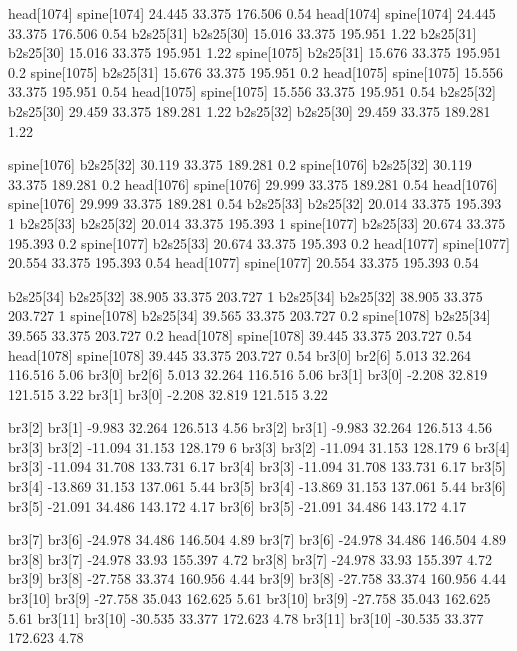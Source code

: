 head[1074]    spine[1074]    24.445    33.375    176.506    0.54
head[1074]    spine[1074]    24.445    33.375    176.506    0.54
b2s25[31]    b2s25[30]    15.016    33.375    195.951    1.22
b2s25[31]    b2s25[30]    15.016    33.375    195.951    1.22
spine[1075]    b2s25[31]    15.676    33.375    195.951    0.2
spine[1075]    b2s25[31]    15.676    33.375    195.951    0.2
head[1075]    spine[1075]    15.556    33.375    195.951    0.54
head[1075]    spine[1075]    15.556    33.375    195.951    0.54
b2s25[32]    b2s25[30]    29.459    33.375    189.281    1.22
b2s25[32]    b2s25[30]    29.459    33.375    189.281    1.22


spine[1076]    b2s25[32]    30.119    33.375    189.281    0.2
spine[1076]    b2s25[32]    30.119    33.375    189.281    0.2
head[1076]    spine[1076]    29.999    33.375    189.281    0.54
head[1076]    spine[1076]    29.999    33.375    189.281    0.54
b2s25[33]    b2s25[32]    20.014    33.375    195.393    1
b2s25[33]    b2s25[32]    20.014    33.375    195.393    1
spine[1077]    b2s25[33]    20.674    33.375    195.393    0.2
spine[1077]    b2s25[33]    20.674    33.375    195.393    0.2
head[1077]    spine[1077]    20.554    33.375    195.393    0.54
head[1077]    spine[1077]    20.554    33.375    195.393    0.54


b2s25[34]    b2s25[32]    38.905    33.375    203.727    1
b2s25[34]    b2s25[32]    38.905    33.375    203.727    1
spine[1078]    b2s25[34]    39.565    33.375    203.727    0.2
spine[1078]    b2s25[34]    39.565    33.375    203.727    0.2
head[1078]    spine[1078]    39.445    33.375    203.727    0.54
head[1078]    spine[1078]    39.445    33.375    203.727    0.54
br3[0]    br2[6]    5.013    32.264    116.516    5.06
br3[0]    br2[6]    5.013    32.264    116.516    5.06
br3[1]    br3[0]    -2.208    32.819    121.515    3.22
br3[1]    br3[0]    -2.208    32.819    121.515    3.22


br3[2]    br3[1]    -9.983    32.264    126.513    4.56
br3[2]    br3[1]    -9.983    32.264    126.513    4.56
br3[3]    br3[2]    -11.094    31.153    128.179    6
br3[3]    br3[2]    -11.094    31.153    128.179    6
br3[4]    br3[3]    -11.094    31.708    133.731    6.17
br3[4]    br3[3]    -11.094    31.708    133.731    6.17
br3[5]    br3[4]    -13.869    31.153    137.061    5.44
br3[5]    br3[4]    -13.869    31.153    137.061    5.44
br3[6]    br3[5]    -21.091    34.486    143.172    4.17
br3[6]    br3[5]    -21.091    34.486    143.172    4.17


br3[7]    br3[6]    -24.978    34.486    146.504    4.89
br3[7]    br3[6]    -24.978    34.486    146.504    4.89
br3[8]    br3[7]    -24.978    33.93    155.397    4.72
br3[8]    br3[7]    -24.978    33.93    155.397    4.72
br3[9]    br3[8]    -27.758    33.374    160.956    4.44
br3[9]    br3[8]    -27.758    33.374    160.956    4.44
br3[10]    br3[9]    -27.758    35.043    162.625    5.61
br3[10]    br3[9]    -27.758    35.043    162.625    5.61
br3[11]    br3[10]    -30.535    33.377    172.623    4.78
br3[11]    br3[10]    -30.535    33.377    172.623    4.78


